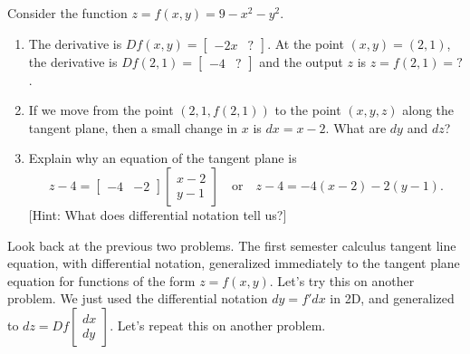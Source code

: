 \begin{problem}\label{tangent plane 9-x^2-y^2}%
%
%
 Consider the function $z=f(x,y)=9-x^2-y^2$. 
\begin{enumerate}
 \item The derivative is $Df(x,y) = \begin{bmatrix}-2x&?\end{bmatrix}$. At the point $(x,y)=(2,1)$, the derivative is $Df(2,1) = \begin{bmatrix}-4&?\end{bmatrix}$ and the output $z$ is $z=f(2,1)=?$.
 \item If we move from the point $(2,1,f(2,1))$ to the point $(x,y,z)$ along the tangent plane, then a small change in $x$ is $dx=x-2$. What are $dy$ and $dz$?
 \item Explain why an equation of the tangent plane is 
$$
z-4=\begin{bmatrix}-4 & -2 \end{bmatrix}\begin{bmatrix}x-2\\y-1\end{bmatrix} 
\quad \text{or}\quad 
z-4=-4(x-2)-2(y-1).$$ [Hint: What does differential notation tell us?]
\end{enumerate}
\end{problem}

Look back at the previous two problems.  The first semester calculus tangent line equation, with differential notation, generalized immediately to the tangent plane equation for functions of the form $z=f(x,y)$. Let's try this on another problem. 
We just used the differential notation $dy=f'dx$ in 2D, and generalized to $dz = Df \begin{bmatrix}dx\\dy\end{bmatrix}$. Let's repeat this on another problem.

